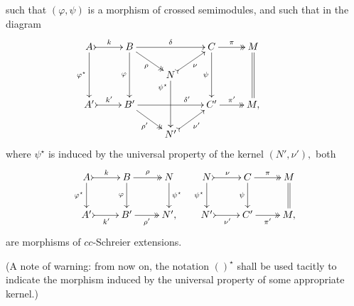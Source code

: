 \documentclass[a4paper]{amsart}
\theoremstyle{plain}
\theoremstyle{definition}
\theoremstyle{remark}
\begin{document}
such that $(\varphi,\psi)$ is a morphism of crossed semimodules, and such that in the diagram
\begin{equation}
\label{eqn:morphism_crossed_Schreier_extensions_factorised}
\begin{aligned}
\xymatrixrowsep{1.3pc}
\xymatrix{
A \ar[dd]_-{\varphi^\star} \ar@{>->}[r]^-k &B \ar[dd]_-{\varphi} \ar@{->>}[rd]_-{\rho} \ar[rr]^-{\delta} & \ &C  \ar[dd]_-{\psi} \ar@{->>}[r]^-{\pi} &{M}  \ar@{=}[dd] \\
 &\ &N \ar[dd]_(.20){\psi^\star} \ar@{>->}[ru]_-{\nu}&\ &\ &\ \\
{A'} \ar@{>->}[r]^-{k'} &{B'} \ar@{->>}[rd]_-{\rho'} \ar[rr]^(.70){\delta'} & \ &{C'} \ar@{->>}[r]^-{\pi'} &{M,} \\
 &\ &{N'} \ar@{>->}[ru]_-{\nu'}&\ &\ &\
}
\end{aligned}
\end{equation}
where $\psi^\star$ is induced by the universal property of the kernel $(N',\nu'),$ both
\begin{equation*}
\begin{aligned}
{\xymatrix{
A \ar@{>->}[r]^-{k} \ar[d]_-{\varphi^\star} &{B} \ar@{->>}[r]^-{\rho} \ar[d]_-{\varphi} &{N} \ar[d]^-{\psi^\star} \\
{A'} \ar@{>->}[r]_-{k'} &{B'} \ar@{->>}[r]_-{\rho'} &{N',}
}}
\
\
{\xymatrix{
N \ar@{>->}[r]^-{\nu} \ar[d]_-{\psi^\star} &{C} \ar@{->>}[r]^-{\pi} \ar[d]_-{\psi} &{M} \ar@{=}[d]\\
{N'} \ar@{>->}[r]_-{\nu'} &{C'} \ar@{->>}[r]_-{\pi'} &{M,}
}}
\end{aligned}
\end{equation*}
are morphisms of $cc$-Schreier extensions.

(A note of warning: from now on, the notation $()^\star$ shall be used tacitly to indicate the morphism induced by the universal property of some appropriate kernel.)
\end{document}
